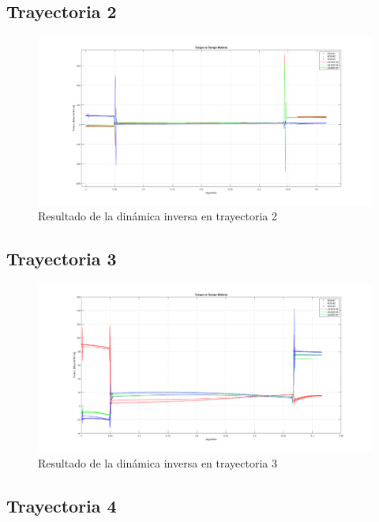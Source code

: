    \subsection{Trayectoria 2}
    
        \begin{figure}[h]
            \centering
            \includegraphics[width=0.9\linewidth]{Main/Chapter7/Images7/2.png}
            \caption{Resultado de la dinámica inversa en trayectoria 2}
            \label{f:cap7_tray2}
        \end{figure}
        
        \newpage
        
        
    \subsection{Trayectoria 3}
    
        \begin{figure}[h]
            \centering
            \includegraphics[width=1.0\linewidth]{Main/Chapter7/Images7/3.png}
            \caption{Resultado de la dinámica inversa en trayectoria 3}
            \label{f:cap7_tray3}
        \end{figure}
                
    \subsection{Trayectoria 4}
    
